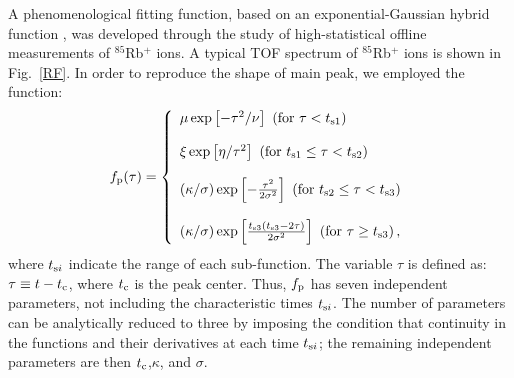 \documentclass[3p]{elsarticle}
\begin{document}
A phenomenological fitting function, based on an exponential-Gaussian hybrid function \citep{Ito2013,Schury2014,Lan2001}, was developed through the study of high-statistical offline measurements of $^{85}$Rb$^{+}$ ions. A typical TOF spectrum of $^{85}$Rb$^{+}$ ions is shown in Fig.~\ref{RF}. In order to reproduce the shape of main peak, we employed the function:
\begin{align}
f_{\rm p}(\tau) = \left\{
\begin{array}{l}
\mu \exp \left[ - \tau^2 / \nu \right] 
\ \left({\rm for} \ \tau < t_{\rm s1}\right) \\
\\
\xi \exp \left[\eta / \tau^2 \right]
\ \left({\rm for} \ t_{\rm s1} \leq \tau < t_{\rm s2}\right)\\
\\
\left( \kappa / \sigma \right) \exp \left[ - \frac{\tau^2}{2\sigma^2} \right] 
\ \left({\rm for} \ t_{\rm s2} \leq \tau < t_{\rm s3}\right)\\
\\
\left( \kappa / \sigma \right) \exp \left[ \frac{t_{\rm s3} (t_{\rm s3} -2\tau)}{2\sigma^2} \right] 
\ \left({\rm for} \ \tau \geq t_{\rm s3}\right),
\end{array}
\right.
\end{align}
where $t_{{\rm s}i}$ indicate the range of each sub-function. The variable $\tau$ is defined as: $\tau \equiv t - t_{\rm c}$, where $t_{\rm c}$ is the peak center. Thus, $f_{\rm p}$ has seven independent parameters, not including the characteristic times $t_{{\rm s}i}$. The number of parameters can be analytically reduced to three by imposing the condition that continuity in the functions and their derivatives at each time $t_{{\rm s}i}$; the remaining independent parameters are then $t_{\rm c}$,$\kappa$, and $\sigma$. 
\end{document}
